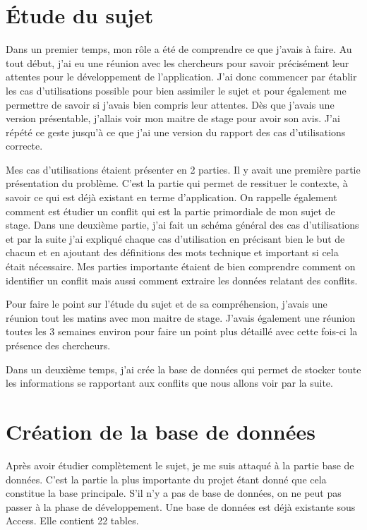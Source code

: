 \documentclass[12pt,a4paper,titlepage,twoside]{report}
\begin{document}
\section{Étude du sujet}
Dans un premier temps, mon rôle a été de comprendre ce que j'avais à faire. Au tout début, j'ai eu une réunion avec les chercheurs pour savoir précisément leur attentes pour le développement de l'application. \newline
J'ai donc commencer par établir les cas d'utilisations possible pour bien assimiler le sujet et pour également me permettre de savoir si j'avais bien compris leur attentes. Dès que j'avais une version présentable, j'allais voir mon maitre de stage pour avoir son avis. J'ai répété ce geste jusqu'à ce que j'ai une version du rapport des cas d'utilisations correcte. \newline\newline

Mes cas d'utilisations étaient présenter en 2 parties. Il y avait une première partie présentation du problème. C'est la partie qui permet de ressituer le contexte, à savoir ce qui est déjà existant en terme d'application. On rappelle également comment est étudier un conflit qui est la partie primordiale de mon sujet de stage. \newline
Dans une deuxième partie, j'ai fait un schéma général des cas d'utilisations et par la suite j'ai expliqué chaque cas d'utilisation en précisant bien le but de chacun et en ajoutant des définitions des mots technique et important si cela était nécessaire. \newline
Mes parties importante étaient de bien comprendre comment on identifier un conflit mais aussi comment extraire les données relatant des conflits. \newline\newline

Pour faire le point sur l'étude du sujet et de sa compréhension, j'avais une réunion tout les matins avec mon maitre de stage. J'avais également une réunion toutes les 3 semaines environ pour faire un point plus détaillé avec cette fois-ci la présence des chercheurs. \newline\newline

Dans un deuxième temps, j'ai crée la base de données qui permet de stocker toute les informations se rapportant aux conflits que nous allons voir par la suite.


\clearpage
\section{Création de la base de données}
Après avoir étudier complètement le sujet, je me suis attaqué à la partie base de données. C'est la partie la plus importante du projet étant donné que cela constitue la base principale. S'il n'y a pas de base de données, on ne peut pas passer à la phase de développement. Une base de données est déjà existante sous Access. Elle contient 22 tables. \newline\newline
\end{document}
